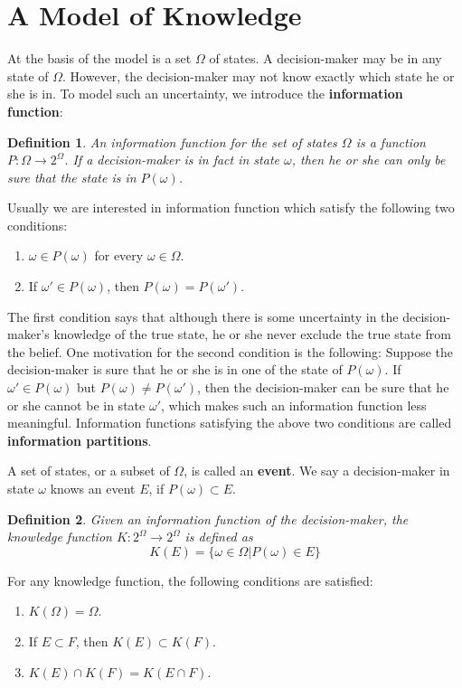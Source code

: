 \documentclass[openany]{book}
\newtheorem{definition}{Definition}[chapter]
\begin{document}
\section{A Model of Knowledge}
At the basis of the model is a set $\Omega$ of states. A decision-maker may be in any state of $\Omega$. However, the decision-maker may not know exactly which state he or she is in. To model such an uncertainty, we introduce the \textbf{information function}:
\begin{definition}
An information function for the set of states $\Omega$ is a function $P:\Omega\rightarrow2^{\Omega}$. If a decision-maker is in fact in state $\omega$, then he or she can only be sure that the state is in $P(\omega)$.
\end{definition}
Usually we are interested in information function which satisfy the following two conditions:
\begin{enumerate}
\item $\omega\in P(\omega)$ for every $\omega\in\Omega$.
\item If $\omega'\in P(\omega)$, then $P(\omega)=P(\omega')$.
\end{enumerate}
The first condition says that although there is some uncertainty in the decision-maker's knowledge of the true state, he or she never exclude the true state from the belief. One motivation for the second condition is the following: Suppose the decision-maker is sure that he or she is in one of the state of $P(\omega)$. If $\omega'\in P(\omega)$ but $P(\omega)\ne P(\omega')$, then the decision-maker can be sure that he or she cannot be in state $\omega'$, which makes such an information function less meaningful. Information functions satisfying the above two conditions are called \textbf{information partitions}.

A set of states, or a subset of $\Omega$, is called an \textbf{event}. We say a decision-maker in state $\omega$ knows an event $E$, if $P(\omega)\subset E$.
\begin{definition}
Given an information function of the decision-maker, the knowledge function $K:2^{\Omega}\rightarrow2^{\Omega}$ is defined as
\begin{equation}
K(E)=\{\omega\in\Omega|P(\omega)\in E\}
\end{equation}
\end{definition}
For any knowledge function, the following conditions are satisfied:
\begin{enumerate}
\item $K(\Omega)=\Omega$.
\item If $E\subset F$, then $K(E)\subset K(F)$.
\item $K(E)\cap K(F)=K(E\cap F)$.
\end{enumerate}
\end{document}
